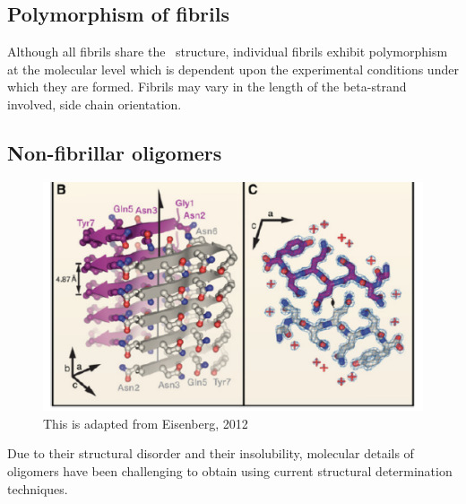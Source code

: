 
\subsection{Polymorphism of fibrils}

Although all fibrils share the \crossb\ structure, individual fibrils exhibit polymorphism at the molecular level which is dependent upon the experimental conditions under which they are formed.  %
Fibrils may vary in the length of the beta-strand involved, side chain orientation. 

\subsection{Non-fibrillar oligomers}
\begin{figure}
  \centering
  \includegraphics[width=6in]{figures/introduction/fibril_xray_model.pdf}
  \caption[Characteristic cross-$\beta$ spacings from X-ray fibre diffraction studies of amyloid fibrils]{This is adapted from Eisenberg, 2012}
  \label{fig:fibril_xray_model}
\end{figure}

Due to their structural disorder and their insolubility, molecular details of oligomers have been challenging to obtain using current structural determination techniques. 

